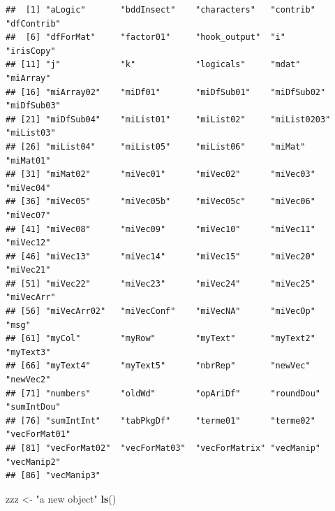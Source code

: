 \documentclass[
]{book}
\newenvironment{Shaded}{\begin{snugshade}}{\end{snugshade}}
\newcommand{\KeywordTok}[1]{\textcolor[rgb]{0.13,0.29,0.53}{\textbf{#1}}}
\newcommand{\NormalTok}[1]{#1}
\newcommand{\StringTok}[1]{\textcolor[rgb]{0.31,0.60,0.02}{#1}}
\begin{document}
\begin{verbatim}
##  [1] "aLogic"       "bddInsect"    "characters"   "contrib"      "dfContrib"   
##  [6] "dfForMat"     "factor01"     "hook_output"  "i"            "irisCopy"    
## [11] "j"            "k"            "logicals"     "mdat"         "miArray"     
## [16] "miArray02"    "miDf01"       "miDfSub01"    "miDfSub02"    "miDfSub03"   
## [21] "miDfSub04"    "miList01"     "miList02"     "miList0203"   "miList03"    
## [26] "miList04"     "miList05"     "miList06"     "miMat"        "miMat01"     
## [31] "miMat02"      "miVec01"      "miVec02"      "miVec03"      "miVec04"     
## [36] "miVec05"      "miVec05b"     "miVec05c"     "miVec06"      "miVec07"     
## [41] "miVec08"      "miVec09"      "miVec10"      "miVec11"      "miVec12"     
## [46] "miVec13"      "miVec14"      "miVec15"      "miVec20"      "miVec21"     
## [51] "miVec22"      "miVec23"      "miVec24"      "miVec25"      "miVecArr"    
## [56] "miVecArr02"   "miVecConf"    "miVecNA"      "miVecOp"      "msg"         
## [61] "myCol"        "myRow"        "myText"       "myText2"      "myText3"     
## [66] "myText4"      "myText5"      "nbrRep"       "newVec"       "newVec2"     
## [71] "numbers"      "oldWd"        "opAriDf"      "roundDou"     "sumIntDou"   
## [76] "sumIntInt"    "tabPkgDf"     "terme01"      "terme02"      "vecForMat01" 
## [81] "vecForMat02"  "vecForMat03"  "vecForMatrix" "vecManip"     "vecManip2"   
## [86] "vecManip3"
\end{verbatim}

\begin{Shaded}
\begin{Highlighting}[]
\NormalTok{zzz <-}\StringTok{ "a new object"}
\KeywordTok{ls}\NormalTok{()}
\end{Highlighting}
\end{Shaded}
\end{document}
